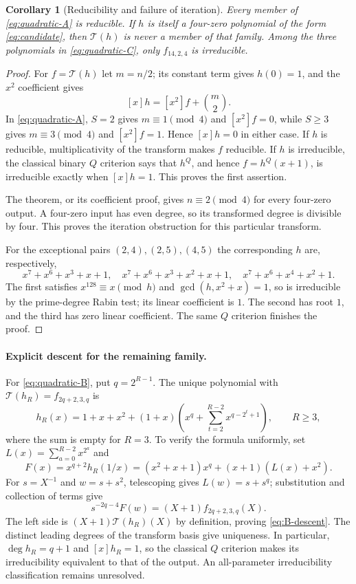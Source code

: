 \documentclass[11pt]{article}
\newtheorem{corollary}[proposition]{Corollary}
\theoremstyle{definition}
\theoremstyle{remark}
\begin{document}
\begin{corollary}[Reducibility and failure of iteration]
\label{cor:quadratic-limits}
Every member of \eqref{eq:quadratic-A} is reducible.
If $h$ is itself a four-zero polynomial of the form
\eqref{eq:candidate}, then $\mathcal T(h)$ is never a member of
that family. Among the three polynomials in
\eqref{eq:quadratic-C}, only $f_{14,2,4}$ is irreducible.
\end{corollary}
\begin{proof}
For $f=\mathcal T(h)$ let $m=n/2$; its constant term gives $h(0)=1$,
and the $x^2$ coefficient gives
\begin{equation}\label{eq:quadratic-trace}
 [x]h=[x^2]f+\binom m2.
\end{equation}
In \eqref{eq:quadratic-A}, $S=2$ gives $m\equiv1\pmod4$ and
$[x^2]f=0$, while $S\ge3$ gives $m\equiv3\pmod4$ and $[x^2]f=1$.
Hence $[x]h=0$ in either case. If $h$ is reducible, multiplicativity
of the transform makes $f$ reducible. If $h$ is irreducible, the
classical binary $Q$ criterion \cite[Theorem 1.1]{Ugo13} says that
$h^Q$, and hence $f=h^Q(x+1)$, is irreducible exactly when $[x]h=1$.
This proves the first assertion.

The theorem, or its coefficient proof, gives $n\equiv2\pmod4$
for every four-zero output. A four-zero input has even degree,
so its transformed degree is divisible by four. This proves the
iteration obstruction for this particular transform.

For the exceptional pairs $(2,4),(2,5),(4,5)$ the corresponding
$h$ are, respectively,
\[
 x^7+x^6+x^3+x+1,\quad
 x^7+x^6+x^3+x^2+x+1,\quad
 x^7+x^6+x^4+x^2+1.
\]
The first satisfies $x^{128}\equiv x\pmod h$ and
$\gcd(h,x^2+x)=1$, so is irreducible by the prime-degree Rabin test;
its linear coefficient is $1$. The second has root $1$,
and the third has zero linear coefficient. The same $Q$ criterion
finishes the proof.
\end{proof}

\paragraph{Explicit descent for the remaining family.}
For \eqref{eq:quadratic-B}, put $q=2^{R-1}$. The unique polynomial with
$\mathcal T(h_R)=f_{2q+2,3,q}$ is
\begin{equation}\label{eq:B-descent}
 h_R(x)=1+x+x^2+(1+x)\left(x^q+
       \sum_{t=2}^{R-2}x^{q-2^t+1}\right),\qquad R\ge3,
\end{equation}
where the sum is empty for $R=3$. To verify the formula uniformly, set
$L(x)=\sum_{a=0}^{R-2}x^{2^a}$ and
\[
 F(x)=x^{q+2}h_R(1/x)
     =(x^2+x+1)x^q+(x+1)(L(x)+x^2).
\]
For $s=X^{-1}$ and $w=s+s^2$, telescoping gives $L(w)=s+s^q$;
substitution and collection of terms give
\[
 s^{-2q-4}F(w)=(X+1)f_{2q+2,3,q}(X).
\]
The left side is $(X+1)\mathcal T(h_R)(X)$ by definition, proving
\eqref{eq:B-descent}. The distinct leading degrees of the transform
basis give uniqueness. In particular, $\deg h_R=q+1$ and $[x]h_R=1$,
so the classical $Q$ criterion makes its irreducibility equivalent to
that of the output. An all-parameter irreducibility classification remains unresolved.
\end{document}
